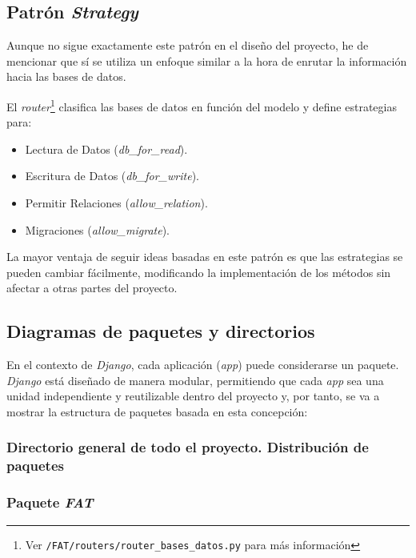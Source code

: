 \subsection{Patrón \emph{Strategy}}

Aunque no sigue exactamente este patrón en el diseño del proyecto, he de mencionar que sí se utiliza un enfoque similar a la hora de enrutar la información hacia las bases de datos. 

El \emph{router}\footnote{Ver \texttt{/FAT/routers/router\_bases\_datos.py} para más información} clasifica las bases de datos en función del modelo y define estrategias para:

\begin{itemize}
\tightlist
\item 
Lectura de Datos (\emph{db\_for\_read}).
\item 
Escritura de Datos (\emph{db\_for\_write}).
\item 
Permitir Relaciones (\emph{allow\_relation}).
\item
Migraciones (\emph{allow\_migrate}).
\end{itemize}

La mayor ventaja de seguir ideas basadas en este patrón es que las estrategias se pueden cambiar fácilmente, modificando la implementación de los métodos sin afectar a otras partes del proyecto. 


\subsection{Diagramas de paquetes y directorios}

En el contexto de \emph{Django}, cada aplicación (\emph{app}) puede considerarse un paquete. \emph{Django} está diseñado de manera modular, permitiendo que cada \emph{app} sea una unidad independiente y reutilizable dentro del proyecto y, por tanto, se va a mostrar la estructura de paquetes basada en esta concepción:

\newpage
\subsubsection{Directorio general de todo el proyecto. Distribución de paquetes}



\subsubsection{Paquete \emph{FAT}}


